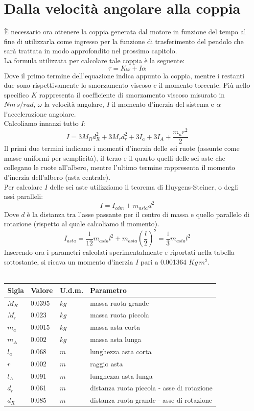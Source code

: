 \section{Dalla velocità angolare alla coppia}
È necessario ora ottenere la coppia generata dal motore in funzione del tempo al fine di utilizzarla come ingresso per la funzione di trasferimento del pendolo che sarà trattata in modo approfondito nel prossimo capitolo.\\
La formula utilizzata per calcolare tale coppia è la seguente:
$$
\tau=K\omega+I\alpha
$$
Dove il primo termine dell'equazione indica appunto la coppia, mentre i restanti due sono rispettivamente lo smorzamento viscoso e il momento torcente.
Più nello specifico $K$ rappresenta il coefficiente di smorzamento viscoso misurato in $Nm\,s/rad$, $\omega$ la velocità angolare, $I$ il momento d'inerzia del sistema e $\alpha$ l'accelerazione angolare.\\
Calcoliamo innanzi tutto $I$: 
$$
I=3M_Rd_R^2+3M_rd_r^2+3I_a+3I_A+\displaystyle\frac{m_ar^2}{2}
$$
Il primi due termini indicano i momenti d'inerzia delle sei ruote (assunte come masse uniformi per semplicità), il terzo e il quarto quelli delle sei aste che collegano le ruote all'albero, mentre l'ultimo termine rappresenta il momento d'inerzia dell'albero (asta centrale).\\
Per calcolare $I$ delle sei aste utilizziamo il teorema di Huygens-Steiner, o degli assi paralleli:
$$
I=I_{cdm}+m_{asta}d^2
$$
Dove $d$ è la distanza tra l'asse passante per il centro di massa e quello parallelo di rotazione (rispetto al quale calcoliamo il momento).\\
$$
I_{asta}=\displaystyle\frac{1}{12}m_{asta}l^2+m_{asta}(\displaystyle\frac{l}{2})^2=\displaystyle\frac{1}{3}m_{asta}l^2
$$
Inserendo ora i parametri calcolati sperimentalmente e riportati nella tabella sottostante, si ricava un momento d'inerzia $I$ pari a 0.001364 $Kg\,m^2$.\\\\
\begin{tabular}{|l|l|l|l|}
	\hline
	\textbf{Sigla} & \textbf{Valore} & \textbf{U.d.m.} & \textbf{Parametro}\\
	\hline
	$M_R$ & 0.0395 & $kg$ & massa ruota grande\\
	\hline
	$M_r$ & 0.023 & $kg$ & massa ruota piccola\\
	\hline
	$m_a$ & 0.0015 & $kg$ & massa asta corta\\	
	\hline
	$m_A$ & 0.002 & $kg$ & massa asta lunga\\	
	\hline
	$l_a$ & 0.068 & $m$ & lunghezza asta corta\\
	\hline
	$r$ & 0.002 & $m$ & raggio asta\\
	\hline
	$l_A$ & 0.091 & $m$ & lunghezza asta lunga\\
	\hline
	$d_r$ & 0.061 & $m$ & distanza ruota piccola - asse di rotazione\\
	\hline
	$d_R$ & 0.085 & $m$  & distanza ruota grande - asse di rotazione\\
	\hline
\end{tabular}\\\\\\
